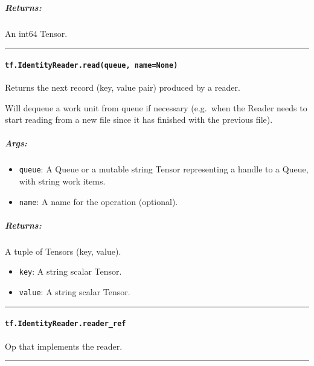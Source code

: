 \subparagraph{Returns: }\label{returns-20}

An int64 Tensor.

\begin{center}\rule{0.5\linewidth}{\linethickness}\end{center}

\paragraph{\texorpdfstring{\texttt{tf.IdentityReader.read(queue,\ name=None)}
}{tf.IdentityReader.read(queue, name=None) }}\label{tf.identityreader.readqueue-namenone}

Returns the next record (key, value pair) produced by a reader.

Will dequeue a work unit from queue if necessary (e.g.~when the Reader
needs to start reading from a new file since it has finished with the
previous file).

\subparagraph{Args: }\label{args-25}

\begin{itemize}
\tightlist
\item
  \texttt{queue}: A Queue or a mutable string Tensor representing a
  handle to a Queue, with string work items.
\item
  \texttt{name}: A name for the operation (optional).
\end{itemize}

\subparagraph{Returns: }\label{returns-21}

A tuple of Tensors (key, value).

\begin{itemize}
\tightlist
\item
  \texttt{key}: A string scalar Tensor.
\item
  \texttt{value}: A string scalar Tensor.
\end{itemize}

\begin{center}\rule{0.5\linewidth}{\linethickness}\end{center}

\paragraph{\texorpdfstring{\texttt{tf.IdentityReader.reader\_ref}
}{tf.IdentityReader.reader\_ref }}\label{tf.identityreader.readerux5fref}

Op that implements the reader.

\begin{center}\rule{0.5\linewidth}{\linethickness}\end{center}

